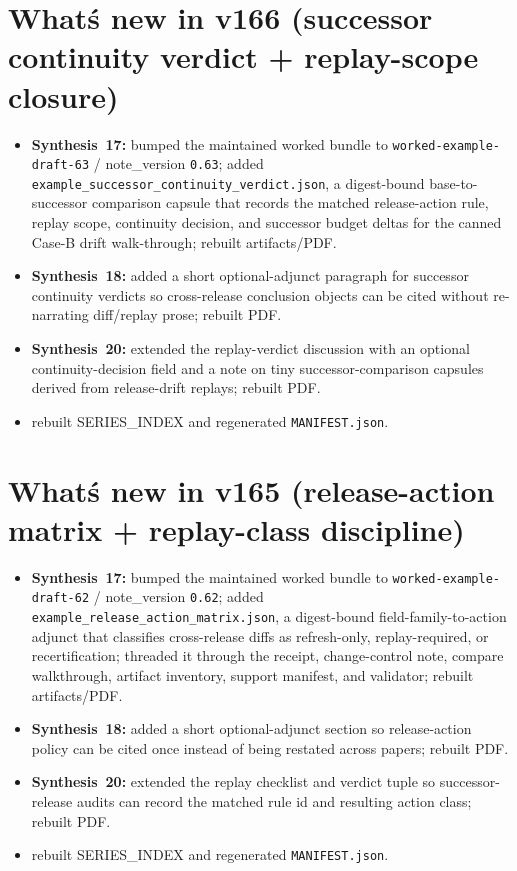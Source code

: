 \documentclass[11pt]{article}
\begin{document}
\section{What\'s new in v166 (successor continuity verdict + replay-scope closure)}
\begin{itemize}[leftmargin=*]
\item \textbf{Synthesis~17:} bumped the maintained worked bundle to \texttt{worked-example-draft-63} / note\_version \texttt{0.63}; added \texttt{example\_successor\_continuity\_verdict.json}, a digest-bound base-to-successor comparison capsule that records the matched release-action rule, replay scope, continuity decision, and successor budget deltas for the canned Case-B drift walk-through; rebuilt artifacts/PDF.
\item \textbf{Synthesis~18:} added a short optional-adjunct paragraph for successor continuity verdicts so cross-release conclusion objects can be cited without re-narrating diff/replay prose; rebuilt PDF.
\item \textbf{Synthesis~20:} extended the replay-verdict discussion with an optional continuity-decision field and a note on tiny successor-comparison capsules derived from release-drift replays; rebuilt PDF.
\item rebuilt SERIES\_INDEX and regenerated \texttt{MANIFEST.json}.
\end{itemize}

\section{What\'s new in v165 (release-action matrix + replay-class discipline)}
\begin{itemize}[leftmargin=*]
\item \textbf{Synthesis~17:} bumped the maintained worked bundle to \texttt{worked-example-draft-62} / note\_version \texttt{0.62}; added \texttt{example\_release\_action\_matrix.json}, a digest-bound field-family-to-action adjunct that classifies cross-release diffs as refresh-only, replay-required, or recertification; threaded it through the receipt, change-control note, compare walkthrough, artifact inventory, support manifest, and validator; rebuilt artifacts/PDF.
\item \textbf{Synthesis~18:} added a short optional-adjunct section so release-action policy can be cited once instead of being restated across papers; rebuilt PDF.
\item \textbf{Synthesis~20:} extended the replay checklist and verdict tuple so successor-release audits can record the matched rule id and resulting action class; rebuilt PDF.
\item rebuilt SERIES\_INDEX and regenerated \texttt{MANIFEST.json}.
\end{itemize}
\end{document}
